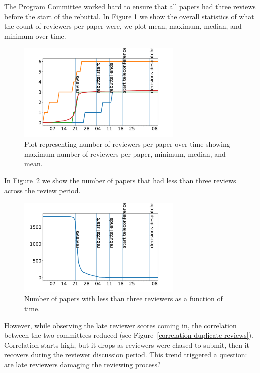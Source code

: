 The Program Committee worked hard to ensure that all  papers had three reviews
before the start of the rebuttal.  In Figure \ref{number-of-reviews-over-time}  we show the  overall statistics of what the count of reviewers per
paper were, we plot mean, maximum, median, and minimum over time. 

\begin{figure}[htb]
\centering
\includegraphics[width=0.70\textwidth]{diagrams/neurips/number-of-reviews-over-time.pdf}

\caption{Plot representing number of reviewers per paper over time showing maximum number of reviewers per paper, minimum, median, and mean. }
\label{number-of-reviews-over-time}
\end{figure}

In Figure~\ref{paper-short-reviews} we show the number of
papers that had less than three reviews across the review period.

\begin{figure}[htb]
\centering
\includegraphics[width=0.70\textwidth]{diagrams/neurips/paper-short-reviews.pdf}

\caption{Number of papers with less than three reviewers as a function of time.}
\label{paper-short-reviews}
\end{figure}

However, while observing the late reviewer scores coming in, the correlation between the two committees reduced (see Figure~\ref{correlation-duplicate-reviews}). Correlation starts high, but it drops as reviewers were chased to submit, then it recovers during the reviewer discussion period. This trend triggered a question: are late reviewers damaging the reviewing process?


